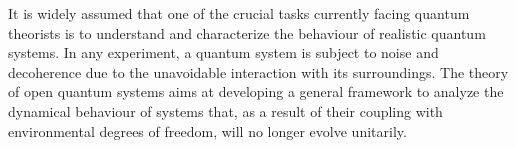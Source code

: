 

It is widely assumed that one of the crucial tasks currently facing quantum theorists
is to understand and characterize the behaviour of realistic quantum systems. In
any experiment, a quantum system is subject to noise and decoherence due to the
unavoidable interaction with its surroundings. The theory of open quantum systems
aims at developing a general framework to analyze the dynamical behaviour of systems
that, as a result of their coupling with environmental degrees of freedom, will no
longer evolve unitarily. \cite{Rivas_2010}



